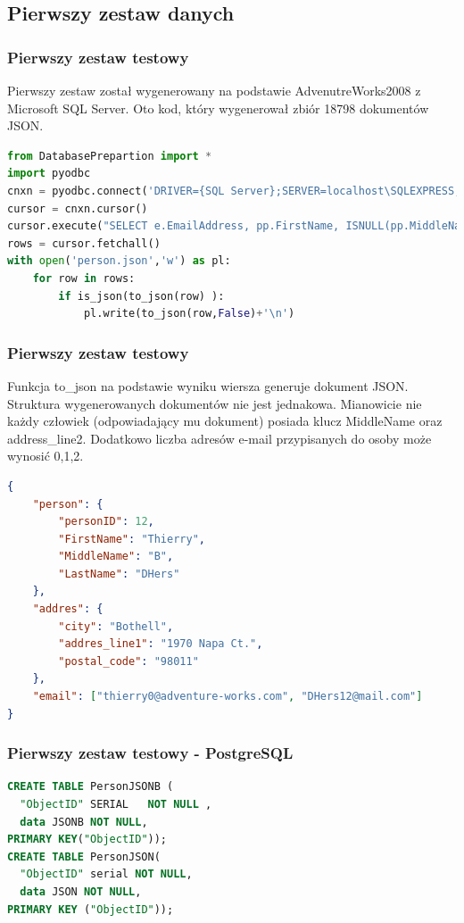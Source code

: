 \documentclass{beamer}
\begin{document}
\subsection{Pierwszy zestaw danych}
\begin{frame}[fragile]
\frametitle{Pierwszy zestaw testowy}
{\small Pierwszy zestaw został wygenerowany na podstawie AdvenutreWorks2008 z Microsoft SQL Server. Oto kod, który wygenerował zbiór 18798 dokumentów JSON. }
\begin{lstlisting}[language=Python,basicstyle=\scriptsize]
from DatabasePrepartion import *
import pyodbc 
cnxn = pyodbc.connect('DRIVER={SQL Server};SERVER=localhost\SQLEXPRESS;DATABASE=AdventureWorks2008;')
cursor = cnxn.cursor()
cursor.execute("SELECT e.EmailAddress, pp.FirstName, ISNULL(pp.MiddleName,'') AS MiddleName, pp.LastName, p.BusinessEntityID,[AddressLine1],ISNULL([AddressLine2],'') AS AddressLine2,[City],[PostalCode] FROM [AdventureWorks2008].[Person].[Address] a,[AdventureWorks2008].[Person].[EmailAddress] e, [AdventureWorks2008].[Person].[BusinessEntityAddress] p, [AdventureWorks2008].[Person].[Person] pp WHERE p.AddressID = a.AddressID and pp.BusinessEntityID=p.BusinessEntityID and e.BusinessEntityID=pp.BusinessEntityID;")
rows = cursor.fetchall()
with open('person.json','w') as pl:
	for row in rows:
		if is_json(to_json(row) ):
			pl.write(to_json(row,False)+'\n')
\end{lstlisting}

\end{frame}

\begin{frame}[fragile]
\frametitle{Pierwszy zestaw testowy}
{\small Funkcja to\_json na podstawie wyniku wiersza generuje dokument JSON. Struktura wygenerowanych dokumentów nie jest jednakowa. Mianowicie nie każdy człowiek (odpowiadający mu dokument) posiada klucz MiddleName oraz address\_line2. Dodatkowo liczba adresów e-mail przypisanych do osoby może wynosić 0,1,2. }
\begin{lstlisting}[language=JSON,basicstyle=\scriptsize]
{
	"person": {
		"personID": 12,
		"FirstName": "Thierry",
		"MiddleName": "B",
		"LastName": "DHers"
	},
	"addres": {
		"city": "Bothell",
		"addres_line1": "1970 Napa Ct.",
		"postal_code": "98011"
	},
	"email": ["thierry0@adventure-works.com", "DHers12@mail.com"]
}
\end{lstlisting}
\vspace{0.5cm}

\end{frame}
\begin{frame}[fragile]
\frametitle{Pierwszy zestaw testowy - PostgreSQL}
\begin{lstlisting}[language=SQL]
CREATE TABLE PersonJSONB (
  "ObjectID" SERIAL   NOT NULL ,
  data JSONB NOT NULL,
PRIMARY KEY("ObjectID"));
CREATE TABLE PersonJSON(
  "ObjectID" serial NOT NULL,
  data JSON NOT NULL,
PRIMARY KEY ("ObjectID"));
\end{lstlisting}
\vspace{0.5cm}

\end{frame}
\end{document}
